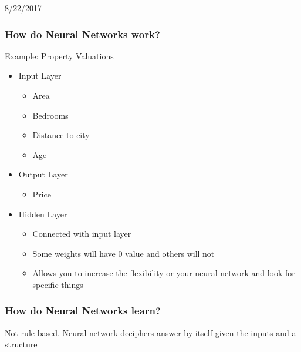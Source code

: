 \documentclass[11pt]{article}
\begin{document}
8/22/2017

\subsubsection{How do Neural Networks work?}
\label{sec:orgcaafff8}

Example: Property Valuations

\begin{itemize}
\item Input Layer
\begin{itemize}
\item Area
\item Bedrooms
\item Distance to city
\item Age
\end{itemize}
\item Output Layer
\begin{itemize}
\item Price
\end{itemize}
\item Hidden Layer
\begin{itemize}
\item Connected with input layer
\item Some weights will have 0 value and others will not
\item Allows you to increase the flexibility or your neural network and look for specific things
\end{itemize}
\end{itemize}

\subsubsection{How do Neural Networks learn?}
\label{sec:orga12f016}

Not rule-based. Neural network deciphers answer by itself given the inputs and a structure
\end{document}
